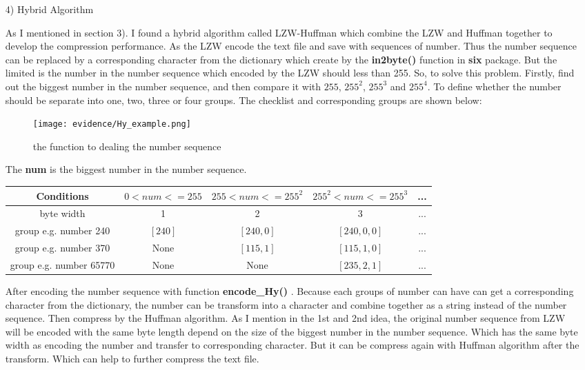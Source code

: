 \documentclass[margin 2cm]{report}
\begin{document}
\begin{enumerate}
\normalsize\item[4)]{Hybrid Algorithm}
\begin{spacing}{1.5}
\normalsize\indent\setlength{\parindent}{2em}As I mentioned in section 3). I found a hybrid algorithm called LZW-Huffman which combine the LZW and Huffman together to develop the compression performance. As the LZW encode the text file and save with sequences of number. Thus the number sequence can be replaced by a corresponding character from the dictionary which create by the \textbf{in2byte()} function in \textbf{six} package. But the limited is the number in the number sequence which encoded by the LZW should less than 255. So, to solve this problem. Firstly, find out the biggest number in the number sequence, and then compare it with $255$, $255^{2}$, $255^{3}$  and  $255^{4}$. To define whether the number should be separate into one, two, three or four groups. The checklist and corresponding groups are shown below:
\end{spacing}

\begin{figure}[H]
\centering
\label{Fig.sub.1}\texttt{[image: evidence/Hy\_example.png]}
\caption{the function to dealing the number sequence}
\label{Fig.main}
\end{figure}

\normalsize The \textbf{num} is the biggest number in the number sequence.
\newline
\begin{tabular}{|c||c|c|c|c|}
\hline
Conditions&$0<num<=255$&$255<num<=255^{2}$&$255^{2}<num<=255^{3}$&...\\
\hline
byte width&1&2&3&...\\
\hline
group e.g. number 240&$[240]$&$[240,0]$&$[240,0,0]$&...\\
\hline
group e.g. number 370&None&$[115,1]$&$[115,1,0]$&...\\
\hline
group e.g. number 65770&None&None&$[235,2,1]$&...\\
\hline
\end{tabular}
\newline
\begin{spacing}{1.5}
\newline\normalsize\indent\setlength{\parindent}{2em} After encoding the number sequence with function \textbf{encode\_Hy()} . Because each groups of number can have can get a corresponding character from the dictionary, the number can be transform into a character and combine together as a string instead of the number sequence. Then compress by the Huffman algorithm. As I mention in the 1st and 2nd idea, the original number sequence from LZW will be encoded with the same byte length depend on the size of the biggest number in the number sequence. Which has the same byte width as encoding the number and transfer to corresponding character. But it can be compress again with Huffman algorithm after the transform. Which can help to further compress the text file.


\end{spacing}

\end{enumerate}
\end{document}
